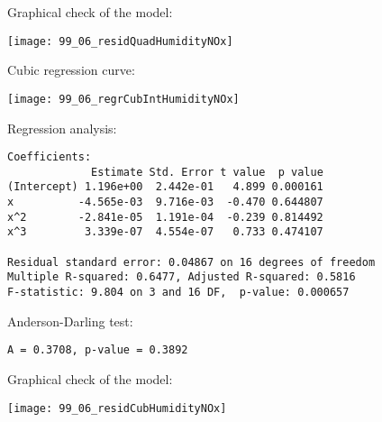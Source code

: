\begin{frame}
  Graphical check of the model:\\
  \vspace{.3cm}
  \begin{center}
    \texttt{[image: 99\_06\_residQuadHumidityNOx]}
  \end{center}
\end{frame}

\begin{frame}
  Cubic regression curve:\\
  \vspace{.3cm}
  \begin{center}
    \texttt{[image: 99\_06\_regrCubIntHumidityNOx]}
  \end{center}
\end{frame}

\begin{frame}[fragile]
  Regression analysis:\\
  \begin{small}
    \begin{verbatim}
Coefficients:
             Estimate Std. Error t value  p value   
(Intercept) 1.196e+00  2.442e-01   4.899 0.000161
x          -4.565e-03  9.716e-03  -0.470 0.644807    
x^2        -2.841e-05  1.191e-04  -0.239 0.814492    
x^3         3.339e-07  4.554e-07   0.733 0.474107

Residual standard error: 0.04867 on 16 degrees of freedom
Multiple R-squared: 0.6477,	Adjusted R-squared: 0.5816 
F-statistic: 9.804 on 3 and 16 DF,  p-value: 0.000657
    \end{verbatim}
  \end{small}
  Anderson-Darling test:\\
  \begin{small}
    \begin{verbatim}
A = 0.3708, p-value = 0.3892
    \end{verbatim}
  \end{small}
\end{frame}

\begin{frame}
  Graphical check of the model:\\
  \vspace{.3cm}
  \begin{center}
    \texttt{[image: 99\_06\_residCubHumidityNOx]}
  \end{center}
\end{frame}



